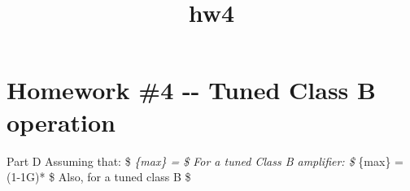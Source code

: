 \documentclass[11pt]{article}
\title{hw4}
\begin{document}
    
    
    \maketitle
    
    

    
    \section{Homework \#4 -\/- Tuned Class B
operation}\label{homework-4----tuned-class-b-operation}

Part D Assuming that: \$ \eta\emph{\{max\} =
 \$ For a tuned Class B amplifier: \$
\eta}\{max\} = \left(1-\frac1G\right)* \$
Also, for a tuned class B \$
\end{document}
